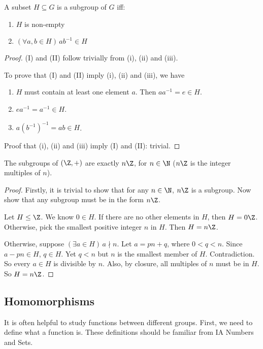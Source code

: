 \documentclass[a4paper]{article}
\begin{document}
\begin{lemma}
  A subset $H\subseteq G$ is a subgroup of $G$ iff:
  \begin{enumerate}[label=(\Roman{*})]
    \item $H$ is non-empty
    \item $(\forall a, b\in H)\,ab^{-1}\in H$
  \end{enumerate}
\end{lemma}
\begin{proof}
  (I) and (II) follow trivially from (i), (ii) and (iii).

  To prove that (I) and (II) imply (i), (ii) and (iii), we have
  \begin{enumerate}
    \item $H$ must contain at least one element $a$. Then $aa^{-1} = e \in H$.
      \setcounter{enumi}{2}
    \item $ea^{-1} = a^{-1} \in H$.
      \setcounter{enumi}{1}
    \item $a(b^{-1})^{-1} = ab\in H$.
  \end{enumerate}

  Proof that (i), (ii) and (iii) imply (I) and (II): trivial.
\end{proof}
\begin{prop}
  The subgroups of $(\Z, +)$  are exactly $n\Z$, for $n\in \N$ ($n\Z$ is the integer multiples of $n$).
\end{prop}
\begin{proof}
  Firstly, it is trivial to show that for any $n \in \N$, $n\Z$ is a subgroup. Now show that any subgroup must be in the form $n\Z$.

  Let $H\leq \Z$. We know $0\in H$. If there are no other elements in $H$, then $H = 0\Z$. Otherwise, pick the smallest positive integer $n$ in $H$. Then $H=n\Z$.

  Otherwise, suppose $(\exists a\in H)\,a \nmid n$. Let $a = pn + q$, where $0 < q < n$. Since $a - pn\in H$, $q\in H$. Yet $q < n$ but $n$ is the smallest member of $H$. Contradiction. So every $a\in H$ is divisible by $n$. Also, by closure, all multiples of $n$ must be in $H$. So $H = n\Z$.
\end{proof}
\subsection{Homomorphisms}
It is often helpful to study functions between different groups. First, we need to define what a function is. These definitions should be familiar from IA Numbers and Sets.
\end{document}
